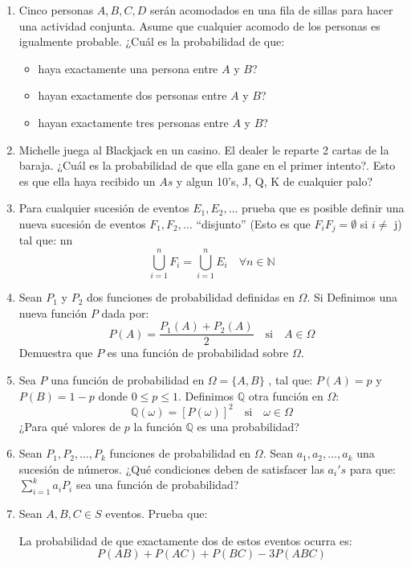 \documentclass[11pt,letterpaper]{report}
\newcommand{\N}{\mathbb{N}}
\newcommand{\Q}{\mathbb{Q}}
\begin{document}
\begin{enumerate}
\item Cinco personas $A,B,C,D$ serán acomodados en una fila de sillas para hacer una actividad 
conjunta. Asume que cualquier acomodo de los personas es igualmente probable. ¿Cuál es la
probabilidad de que:
\begin{itemize}
    \item haya exactamente una persona entre $A$ y $B$?
    \item hayan exactamente dos personas entre $A$ y $B$?
    \item hayan exactamente tres personas entre $A$ y $B$?
\end{itemize}

\item Michelle juega al Blackjack en un casino. El dealer le reparte 2 cartas de la baraja.
¿Cuál es la probabilidad de que ella gane en el primer intento?. Esto es que ella haya
recibido un $As$ y algun 10's, J, Q, K de cualquier palo?

\item Para cualquier sucesión de eventos $E_1, E_2, \ldots$ prueba que es posible definir una
nueva sucesión de eventos $F_1, F_2, \ldots$ ``disjunto'' (Esto es que $F_iF_j =\emptyset$
si $i \not=$ j) tal que:
nn
\[
    \bigcup_{i=1}^{n} F_i = \bigcup_{i=1}^{n} E_i \quad \forall n \in \N
\]

\item Sean $P_1$ y $P_2$ dos funciones de probabilidad definidas en $\Omega$. Si Definimos una
nueva función $P$ dada por:
\[
    P(A) = \frac{P_1(A)+P_2(A)}{2} \quad \text{si} \quad A \in \Omega
\]
Demuestra que $P$ es una función de probabilidad sobre $\Omega$.

\item Sea $P$ una función de probabilidad en $\Omega= \{ A,B \}$ , tal que: $P(A)=p$ y
$P(B)=1-p$ donde $0 \leq p \leq1$.
Definimos $\Q$ otra función en $\Omega$:
\[
    \Q(\omega) = [P(\omega)]^2 \quad \text{si} \quad \omega \in \Omega
\]
¿Para qué valores de $p$ la función $\Q$ es una probabilidad?

\item Sean $P_1, P_2, \ldots, P_k$ funciones de probabilidad en $\Omega$. Sean
$a_1, a_2, \ldots, a_k$ una sucesión de números. ¿Qué condiciones deben de satisfacer las
$a_i's$ para que: $\sum_{i=1}^{k} a_i P_i$ sea una función de probabilidad?

\item Sean $A,B,C \in S$ eventos. Prueba que:

La probabilidad de que exactamente dos de estos eventos ocurra es:
\[
    P(AB) + P(AC) + P(BC) - 3P(ABC)
\]


\end{enumerate}
\end{document}
